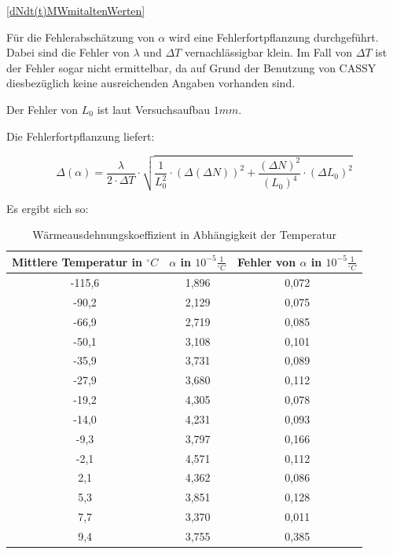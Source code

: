 \ref{dNdt(t)MWmitaltenWerten}

Für die Fehlerabschätzung von $ \alpha $ wird eine Fehlerfortpflanzung durchgeführt.
Dabei sind die Fehler von $ \lambda $  und  $ \Delta T $ vernachlässigbar klein. Im Fall von $ \Delta T $ ist der Fehler sogar nicht ermittelbar, da auf Grund der Benutzung von CASSY diesbezüglich keine ausreichenden Angaben vorhanden sind.

Der Fehler von $ L_{0} $ ist laut Versuchsaufbau $ 1 mm $.

Die Fehlerfortpflanzung liefert:

\begin{equation}
\Delta (\alpha) = \frac{\lambda}{2 \cdot \Delta T} \cdot \sqrt{\frac{1}{L_{0}^{2}} \cdot (\Delta(\Delta N))^{2} + \frac{(\Delta N)^{2}}{(L_{0})^{4}} \cdot (\Delta L_{0})^{2}}
\end{equation}


Es ergibt sich so:

\begin{table}
\begin{tabular}{|c|c|c|}
\hline
Mittlere Temperatur in $^{\circ}C$ &$ \alpha $ in $ 10^{-5}\frac {1}{^{\circ}C} $	&Fehler von $ \alpha $ in $ 10^{-5} \frac{1}{^{\circ}C}  $ \\
\hline
-115,6&				1,896	&		0,072\\
\hline
-90,2	&			2,129	&		0,075\\
\hline
-66,9	&			2,719	&		0,085\\
\hline
-50,1	&			3,108	&		0,101\\
\hline
-35,9	&			3,731	&		0,089\\
\hline
-27,9	&			3,680	&		0,112\\
\hline
-19,2	&			4,305	&		0,078\\
\hline
-14,0	&			4,231	&		0,093\\
\hline
-9,3	&			3,797	&		0,166\\
\hline
-2,1	&			4,571	&		0,112\\
\hline
2,1		&		4,362		&	0,086\\
\hline
5,3		&		3,851		&	0,128\\
\hline
7,7		&		3,370		&	0,011\\
\hline
9,4		&		3,755		&	0,385\\
\hline
\end{tabular}
\label{tbl_4}
\caption{Wärmeausdehnungskoeffizient in Abhängigkeit der Temperatur}
\end{table}

